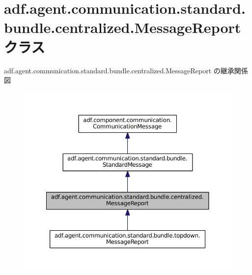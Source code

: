 \hypertarget{classadf_1_1agent_1_1communication_1_1standard_1_1bundle_1_1centralized_1_1MessageReport}{}\section{adf.\+agent.\+communication.\+standard.\+bundle.\+centralized.\+Message\+Report クラス}
\label{classadf_1_1agent_1_1communication_1_1standard_1_1bundle_1_1centralized_1_1MessageReport}


adf.\+agent.\+communication.\+standard.\+bundle.\+centralized.\+Message\+Report の継承関係図
\nopagebreak
\begin{figure}[H]
\begin{center}
\leavevmode
\includegraphics[width=350pt]{classadf_1_1agent_1_1communication_1_1standard_1_1bundle_1_1centralized_1_1MessageReport__inherit__graph}
\end{center}
\end{figure}


